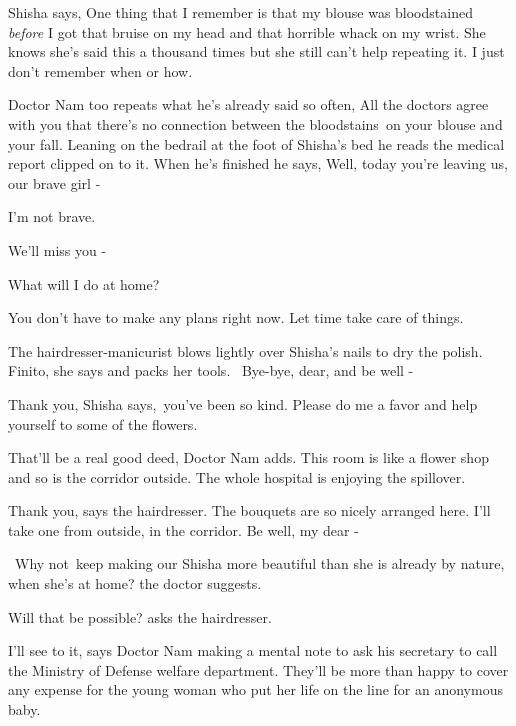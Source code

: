 \documentclass[12pt]{book}
\begin{document}
Shisha says, {\textquotedbl}One thing that I remember is that my blouse was bloodstained \textit{before} I got that
bruise on my head and that horrible whack on my wrist.{\textquotedbl} She knows she's said this a thousand times but
she still can't help repeating it. {\textquotedbl}I just don't remember when or how.{\textquotedbl}

Doctor Nam too repeats what he's already said so often, {\textquotedbl}All the doctors agree with you that there's no
connection between the bloodstains~on your blouse and your fall.{\textquotedbl} Leaning on the bedrail at the foot of
Shisha's bed he reads the medical report clipped on to it. When he's finished he says, {\textquotedbl}Well, today
you're leaving us, our brave girl -{\textquotedbl}

{\textquotedbl}I'm not brave.{\textquotedbl}

{\textquotedbl}We'll miss you -{\textquotedbl}

{\textquotedbl}What will I do at home?{\textquotedbl}

{\textquotedbl}You don't have to make any plans right now. Let time take care of things.{\textquotedbl}

The hairdresser-manicurist blows lightly over Shisha's nails to dry the polish. {\textquotedbl}Finito,{\textquotedbl}
she says and packs her tools. ~{\textquotedbl}Bye-bye, dear, and be well -{\textquotedbl} ~

{\textquotedbl}Thank you,{\textquotedbl} Shisha says,~{\textquotedbl}you've been so kind. Please do me a favor and help
yourself to some of the flowers.{\textquotedbl}

{\textquotedbl}That'll be a real good deed,{\textquotedbl} Doctor Nam adds. {\textquotedbl}This room is like a flower
shop and so is the corridor outside. The whole hospital is enjoying the spillover.{\textquotedbl}

{\textquotedbl}Thank you,{\textquotedbl} says the hairdresser. {\textquotedbl}The bouquets are so nicely arranged here.
I'll take one from outside, in the corridor. Be well, my dear -{\textquotedbl}

~{\textquotedbl}Why not~keep making our Shisha more beautiful than she is already by nature, when she's at
home?{\textquotedbl} the doctor suggests.

{\textquotedbl}Will that be possible?{\textquotedbl} asks the hairdresser.

{\textquotedbl}I'll see to it,{\textquotedbl} says Doctor Nam making a mental note to ask his secretary to call the
Ministry of Defense welfare department. They'll be more than happy to cover any expense for the young woman who put her
life on the line for an anonymous baby.
\end{document}
